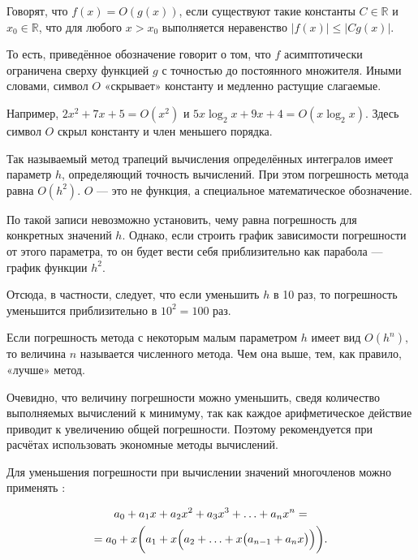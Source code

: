 \begin{defn}
  Говорят, что $f(x)=O(g(x))$, если существуют такие константы
  $C\in\mathbb{R}$ и $x_{0}\in\mathbb{R}$, что для любого $x>x_{0}$
  выполняется неравенство $|f(x)|\leqslant|Cg(x)|$.
\end{defn}

То есть, приведённое обозначение говорит о том, что $f$ асимптотически
ограничена сверху функцией $g$ с точностью до постоянного
множителя. Иными словами, символ $O$ «скрывает» константу и медленно
растущие слагаемые.

\begin{example}
  Например, $2x^2+7x+5 = O(x^2)$ и $5x\log_2 x + 9x + 4 = O(x\log_2
  x)$. Здесь символ $O$ скрыл константу и член меньшего порядка.
\end{example}

\begin{example}
  Так называемый метод трапеций вычисления определённых интегралов
  имеет параметр $h$, определяющий точность вычислений. При этом
  погрешность метода равна $O(h^{2})$. $O$ — это не функция, а
  специальное математическое обозначение.
  
  По такой записи невозможно установить, чему равна погрешность для
  конкретных значений $h$. Однако, если строить график зависимости
  погрешности от этого параметра, то он будет вести себя
  приблизительно как парабола — график функции $h^2$.

  Отсюда, в частности, следует, что если уменьшить $h$ в 10 раз, то
  погрешность уменьшится приблизительно в $10^{2}=100$ раз.
\end{example}

Если погрешность метода с некоторым малым параметром $h$ имеет вид
$O(h^{n}),$ то величина $n$ называется  численного метода. Чем она выше, тем,
как правило, «лучше» метод.

Очевидно, что величину погрешности можно уменьшить, сведя количество
выполняемых вычислений к минимуму, так как каждое арифметическое
действие приводит к увеличению общей погрешности. Поэтому
рекомендуется при расчётах использовать экономные методы вычислений.


Для уменьшения погрешности при вычислении значений многочленов можно
применять :

\begin{multline*}
    a_0 + a_1 x + a_2 x^2 + a_3 x^3 + \ldots + a_n x^n = \\
    = a_0 + x \biggl(a_1 + x\Bigl(a_2 + \ldots
    + x\bigl(a_{n-1} + a_n x\bigr)\Bigr)\biggr).
\end{multline*}

